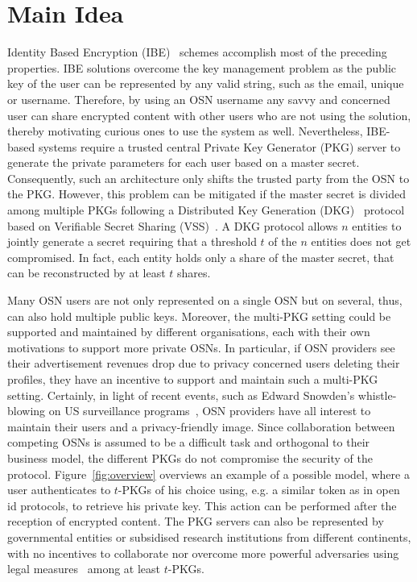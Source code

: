 \section{Main Idea}
Identity Based Encryption (IBE)~\cite{art:Shamir84} schemes accomplish most of the preceding properties. IBE solutions overcome the key management problem as the public key of the user can be represented by any valid string, such as the email, unique \id{} or username. Therefore, by using an OSN username any savvy and concerned user can share encrypted content with other users who are not using the solution, thereby motivating curious ones to use the system as well. Nevertheless, IBE-based systems require a trusted central Private Key Generator (PKG) server to generate the private parameters for each user based on a master secret. Consequently, such an architecture only shifts the trusted party from the OSN to the PKG. However, this problem can be mitigated if the master secret is divided among multiple PKGs following a Distributed Key Generation (DKG)~\cite{art:Pedersen91a} protocol based on Verifiable Secret Sharing (VSS)~\cite{art:ChorGMA85}. A DKG protocol allows $n$ entities to jointly generate a secret requiring that a threshold $t$ of the $n$ entities does not get compromised. In fact, each entity holds only a share of the master secret, that can be reconstructed by at least $t$ shares. 

Many OSN users are not only represented on a single OSN but on several, thus, can also hold multiple public keys. Moreover, the multi-PKG setting could be supported and maintained by different organisations, each with their own motivations to support more private OSNs. In particular, if OSN providers see their advertisement revenues drop due to privacy concerned users deleting their profiles, they have an incentive to support and maintain such a multi-PKG setting. Certainly, in light of recent events, such as Edward Snowden's whistle-blowing on US surveillance programs~\cite{prism}, OSN providers have all interest to maintain their users and a privacy-friendly image. Since collaboration between competing OSNs is assumed to be a difficult task and orthogonal to their business model, the different PKGs do not compromise the security of the protocol. Figure~\ref{fig:overview} overviews an example of a possible model, where a user authenticates to $t$-PKGs of his choice using, e.g. a similar token as in open id protocols, to retrieve his private key. This action can be performed after the reception of encrypted content. The PKG servers can also be represented by governmental entities or subsidised research institutions from different continents, with no incentives to collaborate nor overcome more powerful adversaries using legal measures~\cite{art:Matyszcyk12} among at least $t$-PKGs. 

